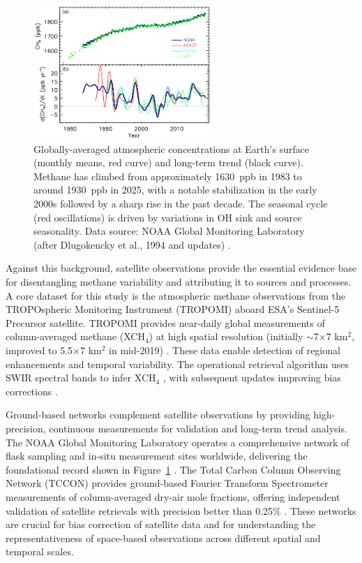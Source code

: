 \begin{figure}[h]
    \centering
    \includegraphics[width=0.6\textwidth]{Images/ch4_trend.png}
    \caption[Global  trends from 1983 to 2025]{Globally-averaged atmospheric  concentrations at Earth's surface (monthly means, red curve) and long-term trend (black curve). Methane has climbed from approximately 1630~ppb in 1983 to around 1930~ppb in 2025, with a notable stabilization in the early 2000s followed by a sharp rise in the past decade. The seasonal cycle (red oscillations) is driven by variations in OH sink and source seasonality. Data source: NOAA Global Monitoring Laboratory (after Dlugokencky et al., 1994 and updates) \cite{Saunois2020}.}
    \label{fig:ch4_global_trend}
\end{figure}

Against this background, satellite observations provide the essential evidence base for disentangling methane variability and attributing it to sources and processes. A core dataset for this study is the atmospheric methane observations from the TROPOspheric Monitoring Instrument (TROPOMI) aboard ESA's Sentinel-5 Precursor satellite. TROPOMI provides near-daily global measurements of column-averaged methane (XCH$_4$) at high spatial resolution (initially $\sim$7$\times$7 km$^2$, improved to 5.5$\times$7 km$^2$ in mid-2019) \cite{Hu2016, Lorente2021}. These data enable detection of regional enhancements and temporal variability. The operational retrieval algorithm uses SWIR spectral bands to infer XCH$_4$ \cite{Hu2016}, with subsequent updates improving bias corrections \cite{Lorente2021}.

Ground-based networks complement satellite observations by providing high-precision, continuous measurements for validation and long-term trend analysis. The NOAA Global Monitoring Laboratory operates a comprehensive network of flask sampling and in-situ measurement sites worldwide, delivering the foundational record shown in Figure~\ref{fig:ch4_global_trend} \cite{Dlugokencky2011}. The Total Carbon Column Observing Network (TCCON) provides ground-based Fourier Transform Spectrometer measurements of column-averaged dry-air mole fractions, offering independent validation of satellite retrievals with precision better than 0.25\% \cite{Wunch2011}. These networks are crucial for bias correction of satellite data and for understanding the representativeness of space-based observations across different spatial and temporal scales.


